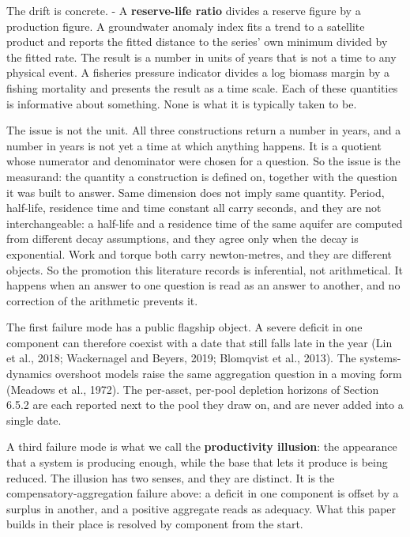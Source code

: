 \documentclass[11pt]{article}
\begin{document}
The drift is concrete. - A \textbf{reserve-life ratio} divides a reserve figure by a production figure. A groundwater anomaly index fits a trend to a satellite product and reports the fitted distance to the series' own minimum divided by the fitted rate. The result is a number in units of years that is not a time to any physical event. A fisheries pressure indicator divides a log biomass margin by a fishing mortality and presents the result as a time scale. Each of these quantities is informative about something. None is what it is typically taken to be.

The issue is not the unit. All three constructions return a number in years, and a number in years is not yet a time at which anything happens. It is a quotient whose numerator and denominator were chosen for a question. So the issue is the measurand: the quantity a construction is defined on, together with the question it was built to answer. Same dimension does not imply same quantity. Period, half-life, residence time and time constant all carry seconds, and they are not interchangeable: a half-life and a residence time of the same aquifer are computed from different decay assumptions, and they agree only when the decay is exponential. Work and torque both carry newton-metres, and they are different objects. So the promotion this literature records is inferential, not arithmetical. It happens when an answer to one question is read as an answer to another, and no correction of the arithmetic prevents it.

The first failure mode has a public flagship object. A severe deficit in one component can therefore coexist with a date that still falls late in the year (Lin et al., 2018; Wackernagel and Beyers, 2019; Blomqvist et al., 2013). The systems-dynamics overshoot models raise the same aggregation question in a moving form (Meadows et al., 1972). The per-asset, per-pool depletion horizons of Section 6.5.2 are each reported next to the pool they draw on, and are never added into a single date.

A third failure mode is what we call the \textbf{productivity illusion}: the appearance that a system is producing enough, while the base that lets it produce is being reduced. The illusion has two senses, and they are distinct. It is the compensatory-aggregation failure above: a deficit in one component is offset by a surplus in another, and a positive aggregate reads as adequacy. What this paper builds in their place is resolved by component from the start.
\end{document}
